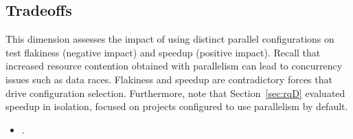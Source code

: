 \begin{center}
\end{center}

\subsection{Tradeoffs}
\label{sec:rq6-tradeoffs}

This dimension assesses the impact of using distinct parallel
configurations on test flakiness (negative impact) and speedup
(positive impact).  Recall that increased resource contention obtained
with parallelism can lead to concurrency issues such as data races.
Flakiness and speedup are contradictory forces that drive
configuration selection.  Furthermore, note that Section~\ref{sec:rqD}
evaluated speedup in isolation, focused on projects configured to use
parallelism by default.

\begin{itemize}
    \item \numRQF{}. \textbf{\RQF{}}
\end{itemize}



